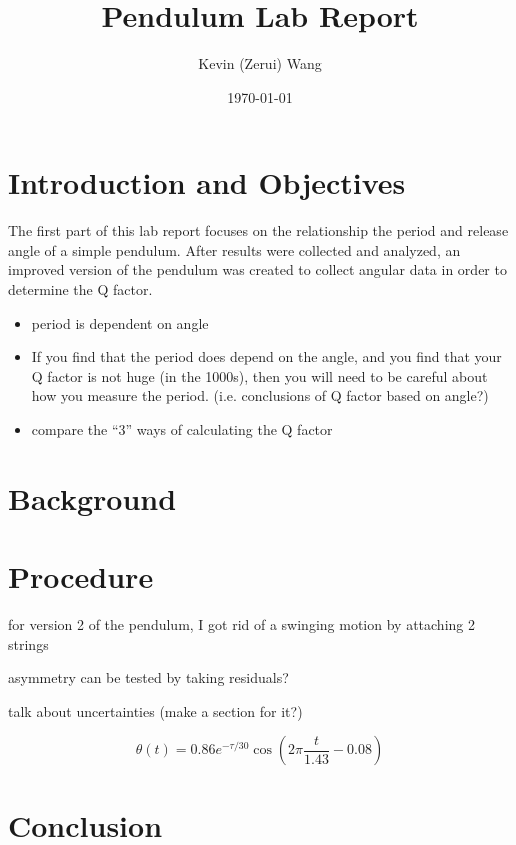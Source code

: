 \documentclass[12pt]{article}
\title{Pendulum Lab Report}
\author{Kevin (Zerui) Wang}
\date{\today}
\begin{document}

\maketitle


\section*{Introduction and Objectives}
The first part of this lab report focuses on the relationship the period and release angle of a simple pendulum. After results were collected and analyzed, an improved version of the pendulum was created to collect angular data in order to determine the Q factor.


\begin{itemize}
    \item period is dependent on angle
    \item If you find that the period does depend on the angle, and you find that your Q factor is not huge (in the 1000s), then you will need to be careful about how you measure the period. (i.e. conclusions of Q factor based on angle?)
    \item compare the ``3'' ways of calculating the Q factor
\end{itemize}

\section*{Background}

\section*{Procedure}
for version 2 of the pendulum, I got rid of a swinging motion by attaching 2 strings

asymmetry can be tested by taking residuals?

talk about uncertainties (make a section for it?)

\begin{equation}
    \theta(t) = 0.86 e^{-\tau/30} \cos\left(2 \pi \frac{t}{1.43} - 0.08\right)
\end{equation}
\section*{Conclusion}
\end{document}
